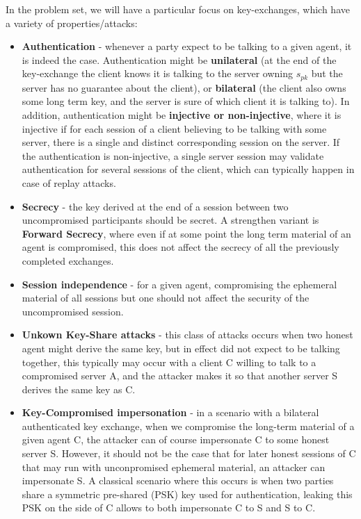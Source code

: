 \documentclass{article}
\newcommand{\sfpk}{\mathit{pk}}
\begin{document}
In the problem set, we will have a particular focus on key-exchanges, which have a variety of properties/attacks:
\begin{itemize}
\item \textbf{Authentication} - whenever a party expect to be talking to a given agent, it is indeed the case. Authentication might be \textbf{unilateral} (at the end of the key-exchange the client knows it is talking to  the server owning $s_\sfpk$ but the server has no guarantee about the client), or \textbf{bilateral} (the client also owns some long term key, and the server is sure of which client it is talking to). In addition, authentication might be \textbf{injective or non-injective}, where it is injective if for each session of a client believing to be talking with some server, there is a single and distinct corresponding session on the server. If the authentication is non-injective, a single server session may validate authentication for several sessions of the client, which can typically happen in case of replay attacks.
\item \textbf{Secrecy} - the key derived at the end of a session between two uncompromised participants should be secret. A strengthen variant is \textbf{Forward Secrecy}, where even if at some point the long term material of an agent is compromised, this does not affect the secrecy of all the previously completed exchanges.
\item \textbf{Session independence} - for a given agent, compromising the ephemeral material of all sessions but one should not affect the security of the uncompromised session.
\item \textbf{Unkown Key-Share attacks} -  this class of attacks occurs when two honest agent might derive the same key, but in effect did not expect to be talking together, this typically may occur with a client C willing to talk to a compromised server A, and the attacker makes it so that another server S derives the same key as C.
\item \textbf{Key-Compromised impersonation} - in a scenario with a bilateral authenticated key exchange, when we compromise the long-term material of a given agent C, the attacker can of course impersonate C to some honest server S. However, it should not be the case that for later honest sessions of C that may run with unconpromised ephemeral material, an attacker can impersonate S.  A classical scenario where this occurs is when two parties share a symmetric pre-shared (PSK) key used for authentication, leaking this PSK on the side of C allows to both impersonate C to S and S to C.
\end{itemize}
\end{document}
